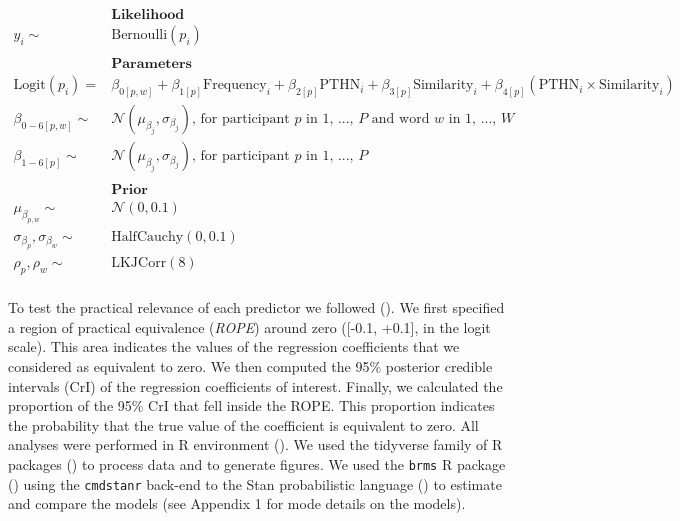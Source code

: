 \documentclass[
]{article}
\begin{document}
\[
\begin{aligned}
&\textbf{Likelihood}  \\
y_{i} \sim & \text{Bernoulli}(p_{i}) \\ \\
&\textbf{Parameters}  \\
\text{Logit}(p_{i}) = &  \beta_{0[p,w]} + \beta_{1[p]} \text{Frequency}_{i} + \beta_{2[p]} \text{PTHN}_i + \beta_{3[p]} \text{Similarity}_i + \beta_{4[p]} (\text{PTHN}_i \times \text{Similarity}_i) \\
\beta_{0-6[p,w]} \sim & \mathcal{N}(\mu_{\beta_{j}}, \sigma_{\beta_{j}}) \text{, for participant } p \text{ in 1, ..., } P \text{ and  word } w \text{ in 1, ..., } W \\
\beta_{1-6[p]} \sim &  \mathcal{N}(\mu_{\beta_{j}}, \sigma_{\beta_{j}}) \text{, for participant } p \text{ in 1, ..., } P \\ \\
&\textbf{Prior}  \\
\mu_{\beta_{p,w}}  \sim &  \mathcal{N}(0, 0.1) \\
\sigma_{\beta_{p}},  \sigma_{\beta_{w}} \sim & \text{HalfCauchy}(0, 0.1) \\
\rho_{p}, \rho_{w} \sim & \text{LKJCorr}(8) \\
\end{aligned}
\]

To test the practical relevance of each predictor we followed
(). We
first specified a region of practical equivalence (\emph{ROPE}) around
zero ({[}-0.1, +0.1{]}, in the logit scale). This area indicates the
values of the regression coefficients that we considered as equivalent
to zero. We then computed the 95\% posterior credible intervals (CrI) of
the regression coefficients of interest. Finally, we calculated the
proportion of the 95\% CrI that fell inside the ROPE. This proportion
indicates the probability that the true value of the coefficient is
equivalent to zero. All analyses were performed in R environment
(). We used the
tidyverse family of R packages
() to process
data and to generate figures. We used the \texttt{brms} R package
() using the
\texttt{cmdstanr} back-end to the Stan probabilistic language
() to estimate
and compare the models (see Appendix 1 for mode details on the models).
\end{document}
